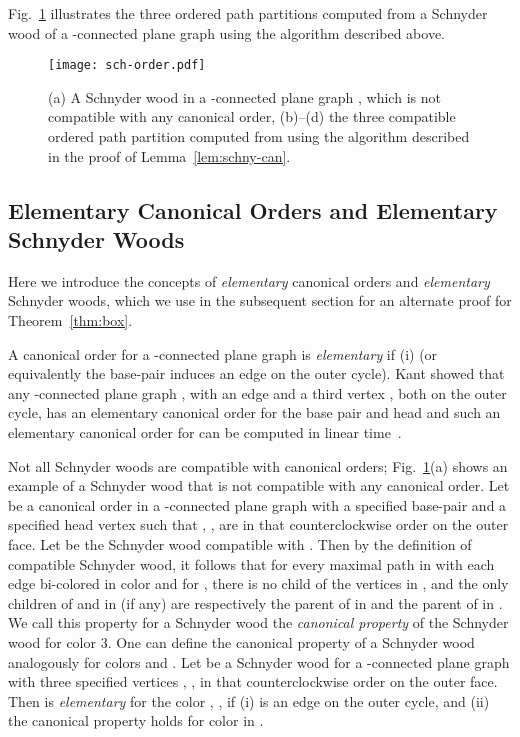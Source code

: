 \documentclass{article}
\newcommand{\df}{\textit}
\begin{document}
Fig.~\ref{fig:sch-order} illustrates the three ordered path partitions computed from a Schnyder wood of
 a -connected plane graph using the algorithm described above.



\begin{figure}[htbp]
\centering
\texttt{[image: sch-order.pdf]}
\caption{(a) A Schnyder wood  in a -connected plane graph , which is not
 compatible with any canonical order, (b)--(d) the three compatible ordered path partition computed from
  using the algorithm described in the proof of Lemma~\ref{lem:schny-can}.}
\label{fig:sch-order}
\end{figure}










\subsection{Elementary Canonical Orders and Elementary Schnyder Woods}


Here we introduce the concepts of \df{elementary} canonical orders and \df{elementary} Schnyder woods,
 which we use in the subsequent section for an alternate proof for Theorem~\ref{thm:box}.


A canonical order  for a -connected plane graph  is \df{elementary}
 if (i)  (or equivalently the base-pair  induces an edge on the outer cycle).
Kant showed that any -connected plane graph , with an edge  and a third vertex ,
 both on the outer cycle, has an elementary canonical order for the base pair  and head 
 and such an elementary canonical order for  can be computed in linear time~\cite{Kan96}.




Not all Schnyder woods are compatible with canonical orders; Fig.~\ref{fig:sch-order}(a) shows an example
 of a Schnyder wood that is not compatible with any canonical order.
 Let  be a canonical order in a -connected plane graph  with
 a specified base-pair  and a specified
 head vertex  such that , ,  are in that counterclockwise order on the outer face.
 Let   be the Schnyder wood compatible with .
 Then by the definition of compatible Schnyder wood, it follows that
for every maximal path  in 
 with each edge  bi-colored in color  and  for , there is no child of the vertices
  in , and the only children of  and  in  (if any) are
 respectively the parent of  in  and the parent of  in .
We call this property for a Schnyder wood  the \df{canonical property} of the
 Schnyder wood for color 3. One can define the canonical property of a Schnyder wood analogously
 for colors  and .
Let  be a Schnyder wood for a -connected plane graph  with three specified
 vertices , ,  in that counterclockwise order on the outer face. Then
  is \textit{elementary} for the color , , if (i)  is an
 edge on the outer cycle, and (ii) the canonical property holds for color  in .
\end{document}
